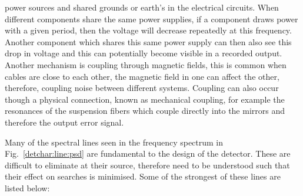 power sources and shared grounds or earth's in the electrical circuits.  When different components share the same power supplies, if
a component draws power with a given period, then the voltage will decrease
repeatedly at this frequency.  Another component which shares this same power
supply can then also see this drop in voltage and this can potentially become
visible in a recorded output.  Another mechanism is coupling through magnetic
fields, this is common when cables are close to each other, the magnetic field
in one can affect the other, therefore, coupling noise between different
systems.  Coupling can also occur though a physical connection, known as
mechanical coupling, for example the resonances of the suspension fibers which
couple directly into the mirrors and therefore the output error signal.

%

Many of the spectral lines seen in the frequency spectrum in
Fig.~\ref{detchar:line:psd} are fundamental to the design of the detector.
These are difficult to eliminate at their source, therefore need to be understood such that their
effect on searches is minimised.  Some of the strongest of these lines are
listed below:

